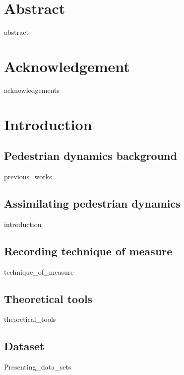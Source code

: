\documentclass[10pt,a4paper]{report}
\begin{document}

\chapter*{Abstract}
	{abstract}



\chapter*{Acknowledgement}
	{acknowledgements}



\tableofcontents



\chapter{Introduction}

\FloatBarrier
\section{Pedestrian dynamics background}
	{previous_works}

\FloatBarrier
\section{Assimilating pedestrian dynamics}
	{introduction}

\FloatBarrier
\section{Recording technique of measure}
	{technique_of_measure}

\FloatBarrier
\section{Theoretical tools}
	{theoretical_tools}

\FloatBarrier
\section{Dataset}
	{Presenting_data_sets}
\end{document}
